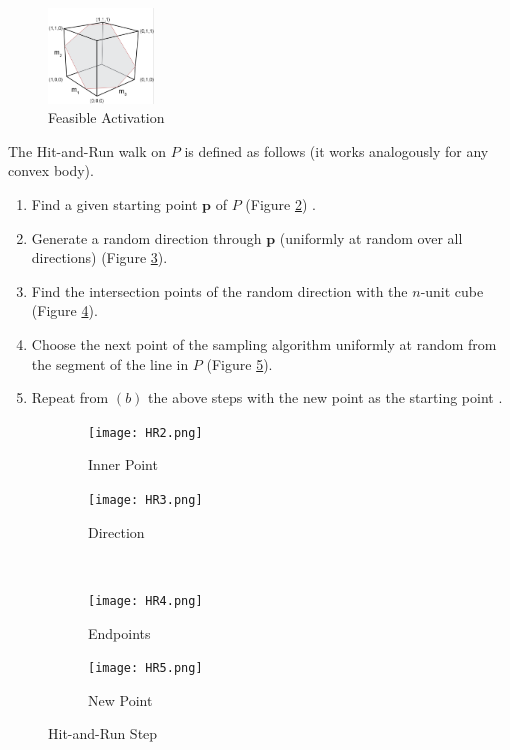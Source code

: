 \begin{figure}[ht]
   \begin{center}
    \includegraphics[width=0.25\textwidth]{sections/figs/feasibleactivation.png}
  \end{center}
  \caption{Feasible Activation}
  \label{fig_hr}
\end{figure}

The Hit-and-Run walk on $P$ is defined as follows (it works analogously for any convex body). 
\begin{enumerate}
\item Find a given starting point $\textbf{p}$ of $P$ (Figure \ref{fig_hr1}) .
\item Generate a random direction through $\textbf{p}$ (uniformly at random over all directions) (Figure \ref{fig_hr2}).
\item Find the intersection points of the random direction with the $n$-unit cube (Figure \ref{fig_hr3}).
\item Choose the next point of the sampling algorithm uniformly at random from the segment of the line in $P$ (Figure \ref{fig_hr4}). 
\item Repeat from $(b)$ the above steps with the new point as the starting point .
\end{enumerate}


\begin{figure}
        \centering
        \begin{subfigure}[b]{0.25\textwidth}
                \texttt{[image: HR2.png]}
                 \caption{Inner Point}
      						\label{fig_hr1}
        \end{subfigure} \hspace{0.5cm}
        \begin{subfigure}[b]{0.25\textwidth}
                \texttt{[image: HR3.png]}
                \caption{Direction}
      					\label{fig_hr2}
        \end{subfigure} \\
        \begin{subfigure}[b]{0.25\textwidth}
                \texttt{[image: HR4.png]}
                 \caption{Endpoints}
      					\label{fig_hr3}
        \end{subfigure} \hspace{0.5cm}
        \begin{subfigure}[b]{0.25\textwidth}
                \texttt{[image: HR5.png]}
                \caption{New Point}
      				 \label{fig_hr4}
        \end{subfigure}
        \caption{Hit-and-Run Step}\label{fig:animals}
\end{figure}

